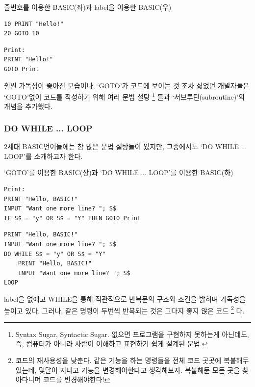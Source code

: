 \documentclass{article}
\begin{document}
\begin{center}

    \centering
    
    줄번호를 이용한 BASIC(좌)과 label을 이용한 BASIC(우)

    \begin{minipage}{0.45\textwidth}
        \begin{lstlisting}
10 PRINT "Hello!"
20 GOTO 10
        \end{lstlisting}
    \end{minipage}
    \hfill
    \begin{minipage}{0.45\textwidth}
        \begin{lstlisting}
Print:
PRINT "Hello!"
GOTO Print
        \end{lstlisting}
    \end{minipage}

\end{center}

훨씬 가독성이 좋아진 모습이나,
`GOTO'가 코드에 보이는 것 조차 싫었던 개발자들은 `GOTO'없이 코드를 작성하기 위해 여러 문법 설탕
\footnote{
    Syntax Sugar, Syntactic Sugar.
    없으면 프로그램을 구현하지 못하는게 아닌데도, 즉, 컴퓨터가 아니라 사람이 이해하고 표현하기 쉽게 설계된 문법.
}
들과 `서브루틴(subroutine)'의 개념을 추가했다.

\subsubsection{DO WHILE ... LOOP}

2세대 BASIC언어들에는 참 많은 문법 설탕들이 있지만, 그중에서도 `DO WHILE ... LOOP'를 소개하고자 한다.



`GOTO'를 이용한 BASIC(상)과 `DO WHILE ... LOOP'를 이용한 BASIC(하)

\begin{lstlisting}
Print:
PRINT "Hello, BASIC!"
INPUT "Want one more line? "; S$
IF S$ = "y" OR S$ = "Y" THEN GOTO Print
\end{lstlisting}
\begin{lstlisting}
PRINT "Hello, BASIC!"
INPUT "Want one more line? "; S$
DO WHILE S$ = "y" OR S$ = "Y"
    PRINT "Hello, BASIC!"
    INPUT "Want one more line? "; S$
LOOP
\end{lstlisting}

label을 없애고 WHILE을 통해 직관적으로 반복문의 구조와 조건을 밝히며 가독성을 높이고 있다.
그러나, 같은 명령이 두번씩 반복되는 것은 그다지 좋지 않은 코드
\footnote{
    코드의 재사용성을 낮춘다. 같은 기능을 하는 명령들을 전체 코드 곳곳에 복붙해두었는데,
    몇달이 지나고 기능을 변경해야한다고 생각해보자.
    복붙해둔 모든 곳을 찾아다니며 코드를 변경해야한다!
}
다. 
\end{document}

